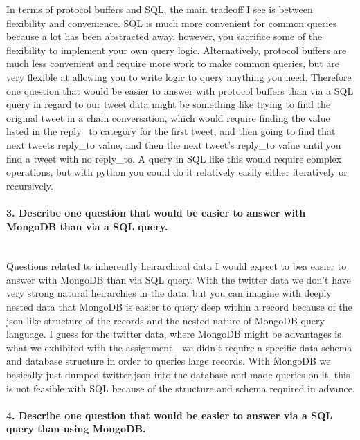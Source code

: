 \documentclass[12pt]{article}
\begin{document}
In terms of protocol buffers and SQL, the main tradeoff I see is between flexibility and convenience.  SQL is much more convenient for common queries because a lot has been abstracted away, however, you sacrifice some of the flexibility to implement your own query logic.  Alternatively, protocol buffers are much less convenient and require more work to make common queries, but are very flexible at allowing you to write logic to query anything you need.  Therefore one question that would be easier to answer with protocol buffers than via a SQL query in regard to our tweet data might be something like trying to find the original tweet in a chain conversation, which would require finding the value listed in the reply_to category for the first tweet, and then going to find that next tweets reply_to value, and then the next tweet's reply_to value until you find a tweet with no reply_to.  A query in SQL like this would require complex operations, but with python you could do it relatively easily either iteratively or recursively.    

\paragraph{3. Describe one question that would be easier to answer with MongoDB than via a SQL query.}\mbox{}\\

Questions related to inherently heirarchical data I would expect to bea easier to answer with MongoDB than via SQL query. With the twitter data we don't have very strong natural heirarchies in the data, but you can imagine with deeply nested data that MongoDB is easier to query deep within a record because of the json-like structure of the records and the nested nature of MongoDB query language. I guess for the twitter data, where MongoDB might be advantages is what we exhibited with the assignment—we didn't require a specific data schema and database structure in order to queries large records.  With MongoDB we basically just dumped twitter.json into the database and made queries on it, this is not feasible with SQL because of the structure and schema required in advance. 

\paragraph{4. Describe one question that would be easier to answer via a SQL query than using MongoDB.}\mbox{}\\
\end{document}
